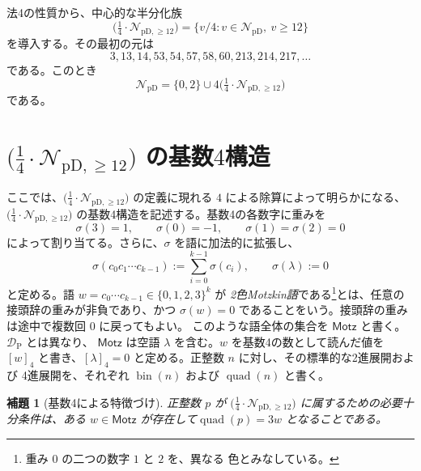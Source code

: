 \documentclass[12pt]{ltjsarticle}
\theoremstyle{plain}
\newtheorem{lemma}[theorem]{補題}
\theoremstyle{definition}
\theoremstyle{plain}
\newcommand{\NpD}{\mathcal{N}_{\mathrm{pD}}}
\newcommand{\DP}{\mathcal{D}_{\mathrm{P}}}
\newcommand{\Pset}{%
  \bigl(\tfrac{1}{4}\cdot\mathcal{N}_{\mathrm{pD},\geq 12}\bigr)%
}
\begin{document}
法4の性質から、中心的な半分化族
\begin{equation}\label{eq:P-def}
 \Pset=\{v/4:v\in\NpD,\ v\geq12\}
\end{equation}
を導入する。その最初の元は
\[
 3,13,14,53,54,57,58,60,213,214,217,\ldots
\]
である。このとき
\begin{equation}\label{eq:NpD-decomp}
 \NpD=\{0,2\}\cup4\Pset
\end{equation}
である。

\section{\texorpdfstring{$\Pset$}{P} の基数\texorpdfstring{$4$}{4}構造}
\label{sec:base4}

ここでは、$\Pset$ の定義に現れる $4$ による除算によって明らかになる、
$\Pset$ の基数4構造を記述する。基数4の各数字に重みを
\[
  \sigma(3)=1,\qquad \sigma(0)=-1,\qquad
  \sigma(1)=\sigma(2)=0
\]
によって割り当てる。さらに、$\sigma$ を語に加法的に拡張し、
\[
 \sigma(c_0c_1\cdots c_{k-1})
 :=\sum_{i=0}^{k-1}\sigma(c_i),
 \qquad
 \sigma(\lambda):=0
\]
と定める。語 $w=c_0\cdots c_{k-1}\in\{0,1,2,3\}^{k}$ が
\emph{2色Motzkin語}である\footnote{重み $0$ の二つの数字 $1$ と $2$ を、異なる
色とみなしている。}とは、任意の接頭辞の重みが非負であり、かつ
$\sigma(w)=0$ であることをいう。接頭辞の重みは途中で複数回 $0$ に戻ってもよい。
このような語全体の集合を $\mathsf{Motz}$ と書く。$\DP$ とは異なり、
$\mathsf{Motz}$ は空語 $\lambda$ を含む。$w$ を基数4の数として読んだ値を $[w]_4$
と書き、$[\lambda]_4=0$ と定める。正整数 $n$ に対し、その標準的な2進展開および
4進展開を、それぞれ $\operatorname{bin}(n)$ および $\operatorname{quad}(n)$ と書く。

\begin{lemma}[基数4による特徴づけ]\label{lem:base4}
正整数 $p$ が $\Pset$ に属するための必要十分条件は、ある $w\in\mathsf{Motz}$ が存在して$ \operatorname{quad}(p)=3w$
となることである。
\end{lemma}
\end{document}
